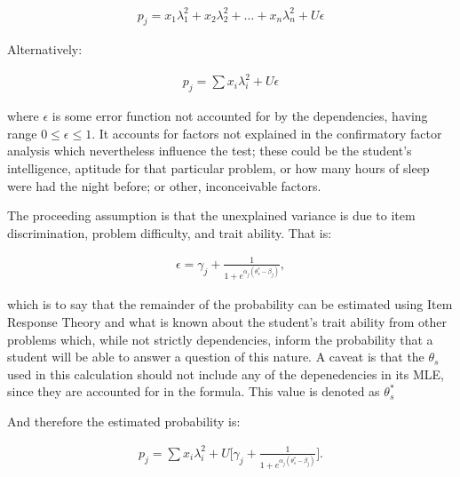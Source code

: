 \begin{equation}
 \begin{array}{llll}
  p_j =  x_1\lambda_1^2 + x_2\lambda_2^2 + \ldots + x_n\lambda_n^2 + U\epsilon
 \end{array}
\end{equation}

Alternatively:

\begin{equation}
 \begin{array}{llll}
  p_j =  \displaystyle\sum x_i\lambda_i^2 + U\epsilon
 \end{array}
\end{equation}

where $\epsilon$ is some error function not accounted for by the dependencies,
having range $0 \leq \epsilon \leq 1$.  It accounts for factors not explained
in the confirmatory factor analysis which nevertheless influence the test;
these could be the student's intelligence, aptitude for that particular
problem, or how many hours of sleep were had the night before; or other,
inconceivable factors.

The proceeding assumption is that the unexplained variance is due to item
discrimination, problem difficulty, and trait ability.  That is:

\begin{equation}
 \begin{array}{llll}
  \epsilon = \gamma_j + \frac{1}{1 + e^{\alpha_j (\theta_s^{*} - \beta_j)}},
 \end{array}
\end{equation}

which is to say that the remainder of the probability can be estimated using
Item Response Theory and what is known about the student's trait ability from
other problems which, while not strictly dependencies, inform the probability
that a student will be able to answer a question of this nature.  A caveat is
that the $\theta_s$ used in this calculation should not include any of the
depenedencies in its MLE, since they are accounted for in the formula.  This
value is denoted as $\theta_s^{*}$

And therefore the estimated probability is:

\begin{equation}
 \begin{array}{llll}
  p_j =  \displaystyle\sum x_i\lambda_i^2 + U \Bigg[ \gamma_j + \frac{1}{1 + e^{\alpha_j (\theta_s^{*} - \beta_j)}} \Bigg].
 \end{array}
\end{equation}

